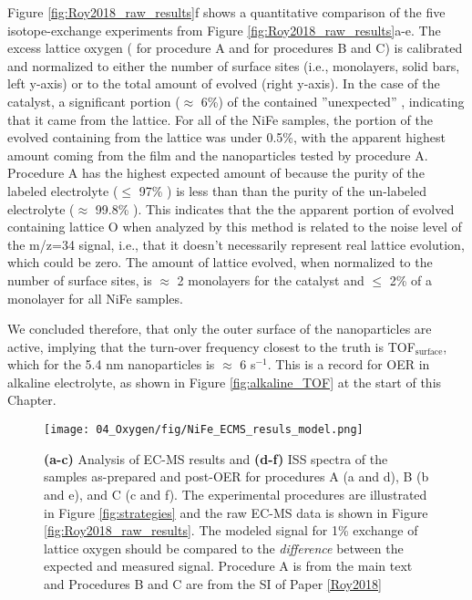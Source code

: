 Figure \ref{fig:Roy2018_raw_results}f shows a quantitative comparison of the five isotope-exchange experiments from Figure \ref{fig:Roy2018_raw_results}a-e. The excess lattice oxygen ( for procedure A and  for procedures B and C) is calibrated and normalized to either the number of surface sites (i.e., monolayers, solid bars, left y-axis) or to the total amount of  evolved (right y-axis). In the case of the  catalyst, a significant portion ($\approx$ 6\%) of the  contained ''unexpected'' , indicating that it came from the lattice. For all of the NiFe samples, the portion of the evolved  containing  from the lattice was under 0.5\%, with the apparent highest amount coming from the film and the nanoparticles tested by procedure A. Procedure A has the highest expected amount of  because the purity of the labeled electrolyte ($\le$ 97\% ) is less than than the purity of the un-labeled electrolyte ($\approx$ 99.8\% ). This indicates that the the apparent portion of evolved  containing lattice O when analyzed by this method is related to the noise level of the m/z=34 signal, i.e., that it doesn't necessarily represent real lattice  evolution, which could be zero. The amount of lattice  evolved, when normalized to the number of surface sites, is $\approx$ 2 monolayers for the  catalyst and $\le$ 2\% of a monolayer for all NiFe samples. 

We concluded therefore, that only the outer surface of the nanoparticles are active, implying that the turn-over frequency closest to the truth is TOF$_{\text{surface}}$, which for the 5.4 nm nanoparticles is $\approx$ 6 s$^{-1}$. This is a record for OER in alkaline electrolyte, as shown in Figure \ref{fig:alkaline_TOF} at the start of this Chapter.

\begin{figure}[p]
	\centering
	\texttt{[image: 04\_Oxygen/fig/NiFe\_ECMS\_resuls\_model.png]}
	\caption{\textbf{(a-c)} Analysis of EC-MS results and \textbf{(d-f)} ISS spectra of the samples as-prepared and post-OER for procedures A (a and d), B (b and e), and C (c and f). The experimental procedures are illustrated in Figure \ref{fig:strategies} and the raw EC-MS data is shown in Figure \ref{fig:Roy2018_raw_results}. The modeled signal for 1\% exchange of lattice oxygen should be compared to the \textit{difference} between the expected and measured  signal. Procedure A is from the main text and Procedures B and C are from the SI of Paper \ref{Roy2018}}
	\label{fig:Roy2018_model}
\end{figure}

